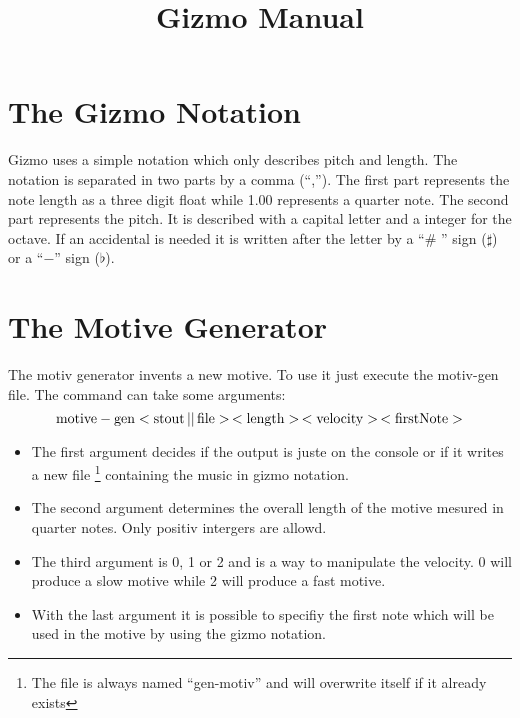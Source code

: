 \documentclass{article}
\title{Gizmo Manual}
\begin{document}
\maketitle
\tableofcontents

\section*{The Gizmo Notation}
Gizmo uses a simple notation which only describes pitch and length. The notation is separated in two  parts by a comma  (``,''). The first part represents the note length as a three digit float while 1.00 represents a quarter note. The second part represents the pitch. It is described with a capital letter and a integer for the octave. If an accidental is needed it is written after the letter by a ``\# '' sign ($\sharp$) or a ``$-$'' sign ($\flat$).


\section{The Motive Generator}
The motiv generator invents a new motive. To use it just execute the motiv-gen file. The command can take some arguments:
$$\rm{motive-gen} <stout\, ||\, file>\,<length>\,<velocity>\,<firstNote>$$

\begin{itemize}

\item The first argument decides if the output is juste on the console or if it  writes a new file \footnote {The file is always named ``gen-motiv'' and will overwrite itself if it already exists} containing the music in gizmo notation.

\item The second argument determines the overall length of the motive mesured in quarter notes. Only positiv intergers are allowd.

\item The third argument is 0, 1 or 2 and is a way to manipulate the velocity. 0 will produce a slow motive while 2 will produce a fast motive.

\item With the last argument it is possible to specifiy the first note which will be used in the motive by using the gizmo notation.

\end{itemize}
\end{document}
